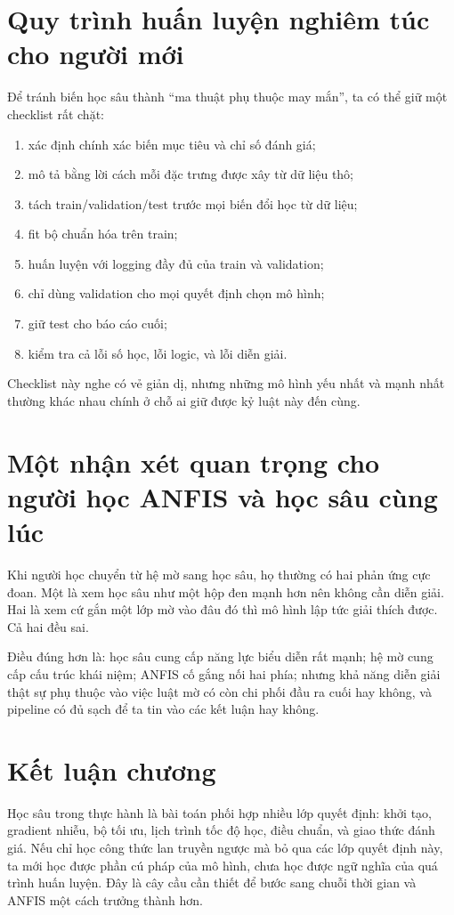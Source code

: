 \section{Quy trình huấn luyện nghiêm túc cho người mới}

Để tránh biến học sâu thành ``ma thuật phụ thuộc may mắn'', ta có thể giữ một checklist rất chặt:

\begin{enumerate}
\item xác định chính xác biến mục tiêu và chỉ số đánh giá;
\item mô tả bằng lời cách mỗi đặc trưng được xây từ dữ liệu thô;
\item tách train/validation/test trước mọi biến đổi học từ dữ liệu;
\item fit bộ chuẩn hóa trên train;
\item huấn luyện với logging đầy đủ của train và validation;
\item chỉ dùng validation cho mọi quyết định chọn mô hình;
\item giữ test cho báo cáo cuối;
\item kiểm tra cả lỗi số học, lỗi logic, và lỗi diễn giải.
\end{enumerate}

Checklist này nghe có vẻ giản dị, nhưng những mô hình yếu nhất và mạnh nhất thường khác nhau chính ở chỗ ai giữ được kỷ luật này đến cùng.

\section{Một nhận xét quan trọng cho người học ANFIS và học sâu cùng lúc}

Khi người học chuyển từ hệ mờ sang học sâu, họ thường có hai phản ứng cực đoan. Một là xem học sâu như một hộp đen mạnh hơn nên không cần diễn giải. Hai là xem cứ gắn một lớp mờ vào đâu đó thì mô hình lập tức giải thích được. Cả hai đều sai.

Điều đúng hơn là: học sâu cung cấp năng lực biểu diễn rất mạnh; hệ mờ cung cấp cấu trúc khái niệm; ANFIS cố gắng nối hai phía; nhưng khả năng diễn giải thật sự phụ thuộc vào việc luật mờ có còn chi phối đầu ra cuối hay không, và pipeline có đủ sạch để ta tin vào các kết luận hay không.

\section{Kết luận chương}

Học sâu trong thực hành là bài toán phối hợp nhiều lớp quyết định: khởi tạo, gradient nhiễu, bộ tối ưu, lịch trình tốc độ học, điều chuẩn, và giao thức đánh giá. Nếu chỉ học công thức lan truyền ngược mà bỏ qua các lớp quyết định này, ta mới học được phần cú pháp của mô hình, chưa học được ngữ nghĩa của quá trình huấn luyện. Đây là cây cầu cần thiết để bước sang chuỗi thời gian và ANFIS một cách trưởng thành hơn.
